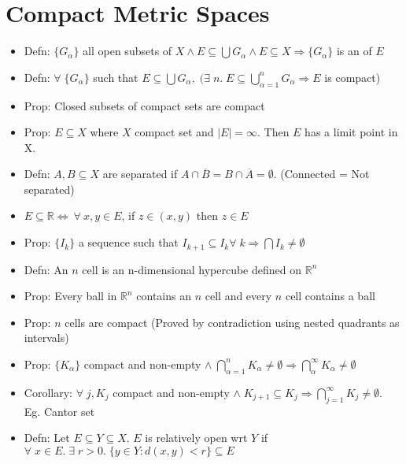 \documentclass[11pt]{article}
\newcommand{\boxinate}[1]{\framebox[1.1\width]{#1}}
\begin{document}

\section{Compact Metric Spaces} %
\begin{itemize}
\item Defn: $\{G_{\alpha}\}$ all open subsets of $X \land E \subseteq \bigcup
  G_{\alpha} \land E \subseteq X \Rightarrow \{G_{\alpha}\}$ is an
  \boxinate{open cover} of $E$

\item Defn: $\forall\;\{G_{\alpha}\}$ such that $E \subseteq \bigcup G_{\alpha}
  ,\;(\exists\;n.\; E \subseteq \bigcup_{\alpha = 1}^n G_{\alpha} \Rightarrow
  E$ is compact)
\item Prop: Closed subsets of compact sets are compact
\item Prop: $E \subseteq X$ where $X$ compact set and $|E| = \infty$. Then $E$ has a limit point in X. 
\item Defn: $A, B \subseteq X$ are separated if $A \cap \overline{B} = B \cap
  \overline{A} = \emptyset$. (Connected = Not separated)
\item $E \subseteq \mathbb{R} \iff ~\forall~x,y \in E$, if $z \in (x, y)$ then
  $z \in E$
\item Prop: $\{I_k\}$ a sequence such that $I_{k+1} \subseteq I_k \forall\;k
  \Rightarrow \bigcap I_k \neq \emptyset$
\item Defn: An $n$ cell is an n-dimensional hypercube defined on $\mathbb{R}^n$
\item Prop: Every ball in $\mathbb{R}^n$ contains an $n$ cell and every $n$
  cell contains a ball
\item Prop: $n$ cells are compact (Proved by contradiction using nested
  quadrants as intervals)
\item Prop: $\{K_{\alpha}\}$ compact and non-empty $\land\; \bigcap_{\alpha =
  1}^n K_{\alpha} \neq \emptyset \Rightarrow \bigcap_{\alpha}^{\infty}
  K_{\alpha} \neq \emptyset$
\item Corollary: $\forall\;j, K_j$ compact and non-empty $\land \;K_{j+1}
  \subseteq K_j \Rightarrow \bigcap_{j=1}^{\infty} K_j \neq
  \emptyset$. Eg. Cantor set
\item Defn: Let $E \subseteq Y \subseteq X$. $E$ is relatively open wrt $Y$ if
  $\forall\;x \in E.\;\exists\;r > 0.\;\{y \in Y: d(x, y) < r\} \subseteq E$
\end{itemize}
\end{document}
